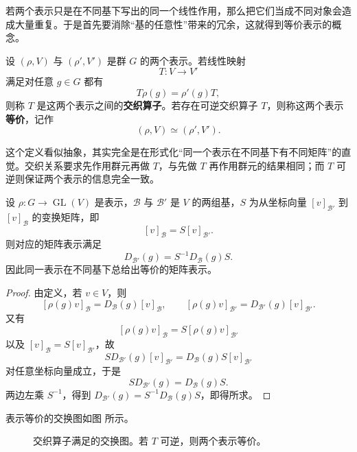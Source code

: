 若两个表示只是在不同基下写出的同一个线性作用，那么把它们当成不同对象会造成大量重复。于是首先要消除“基的任意性”带来的冗余，这就得到等价表示的概念。

\begin{definition}[交织算子与表示等价]
设 $(\rho,V)$ 与 $(\rho',V')$ 是群 $G$ 的两个表示。若线性映射
\[
T:V\to V'
\]
满足对任意 $g\in G$ 都有
\[
T\rho(g)=\rho'(g)T,
\]
则称 $T$ 是这两个表示之间的\textbf{交织算子}。若存在可逆交织算子 $T$，则称这两个表示\textbf{等价}，记作
\[
(\rho,V)\simeq(\rho',V').
\]
\label{def:equivalent-representations}
\end{definition}

这个定义看似抽象，其实完全是在形式化“同一个表示在不同基下有不同矩阵”的直觉。交织关系要求先作用群元再做 $T$，与先做 $T$ 再作用群元的结果相同；而 $T$ 可逆则保证两个表示的信息完全一致。

\begin{proposition}[基变换公式]
设 $\rho:G\to\operatorname{GL}(V)$ 是表示，$\mathcal B$ 与 $\mathcal B'$ 是 $V$ 的两组基，$S$ 为从坐标向量 $[v]_{\mathcal B'}$ 到 $[v]_{\mathcal B}$ 的变换矩阵，即
\[
[v]_{\mathcal B}=S[v]_{\mathcal B'}.
\]
则对应的矩阵表示满足
\[
D_{\mathcal B'}(g)=S^{-1}D_{\mathcal B}(g)S.
\]
因此同一表示在不同基下总给出等价的矩阵表示。
\label{prop:change-of-basis}

\end{proposition}

\begin{proof}
由定义，若 $v\in V$，则
\[
[\rho(g)v]_{\mathcal B}=D_{\mathcal B}(g)[v]_{\mathcal B},
\qquad
[\rho(g)v]_{\mathcal B'}=D_{\mathcal B'}(g)[v]_{\mathcal B'}.
\]
又有
\[
[\rho(g)v]_{\mathcal B}=S[\rho(g)v]_{\mathcal B'}
\]
以及 $[v]_{\mathcal B}=S[v]_{\mathcal B'}$，故
\[
S D_{\mathcal B'}(g)[v]_{\mathcal B'}
= D_{\mathcal B}(g)S[v]_{\mathcal B'}
\]
对任意坐标向量成立，于是
\[
SD_{\mathcal B'}(g)=D_{\mathcal B}(g)S.
\]
两边左乘 $S^{-1}$，得到 $D_{\mathcal B'}(g)=S^{-1}D_{\mathcal B}(g)S$，即得所求。
\end{proof}

表示等价的交换图如图  所示。
\begin{figure}[htbp]
\centering
{}
\caption{交织算子满足的交换图。若 $T$ 可逆，则两个表示等价。}
\label{fig:intertwiner-diagram}
\end{figure}

